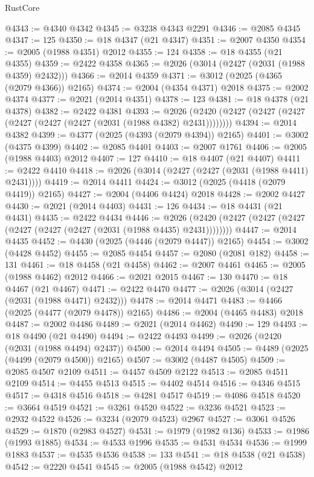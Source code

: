 \begin{lexlean}{RustCore}
\begin{coremodule}
@4343 := @4340 @4342
@4345 := @3238 @4343 @2291
@4346 := @2085 @4345
@4347 := 125
@4350 := @18 @4347 (@21 @4347)
@4351 := @2007 @4350
@4354 := @2005 (@1988 @4351) @2012
@4355 := 124
@4358 := @18 @4355 (@21 @4355)
@4359 := @2422 @4358
@4365 := @2026 (@3014 (@2427 (@2031 (@1988 @4359) @2432)))
@4366 := @2014 @4359
@4371 := @3012 (@2025 (@4365 (@2079 @4366)) @2165)
@4374 := @2004 (@4354 @4371) @2018
@4375 := @2002 @4374
@4377 := @2021 (@2014 @4351)
@4378 := 123
@4381 := @18 @4378 (@21 @4378)
@4382 := @2422 @4381
@4393 := @2026 (@2420 (@2427 (@2427 (@2427 (@2427 (@2427 (@2427 (@2031 (@1988 @4382) @2431))))))))
@4394 := @2014 @4382
@4399 := @4377 (@2025 (@4393 (@2079 @4394)) @2165)
@4401 := @3002 (@4375 @4399)
@4402 := @2085 @4401
@4403 := @2007 @1761
@4406 := @2005 (@1988 @4403) @2012
@4407 := 127
@4410 := @18 @4407 (@21 @4407)
@4411 := @2422 @4410
@4418 := @2026 (@3014 (@2427 (@2427 (@2031 (@1988 @4411) @2431))))
@4419 := @2014 @4411
@4424 := @3012 (@2025 (@4418 (@2079 @4419)) @2165)
@4427 := @2004 (@4406 @4424) @2018
@4428 := @2002 @4427
@4430 := @2021 (@2014 @4403)
@4431 := 126
@4434 := @18 @4431 (@21 @4431)
@4435 := @2422 @4434
@4446 := @2026 (@2420 (@2427 (@2427 (@2427 (@2427 (@2427 (@2427 (@2031 (@1988 @4435) @2431))))))))
@4447 := @2014 @4435
@4452 := @4430 (@2025 (@4446 (@2079 @4447)) @2165)
@4454 := @3002 (@4428 @4452)
@4455 := @2085 @4454
@4457 := @2080 (@2081 @182)
@4458 := 131
@4461 := @18 @4458 (@21 @4458)
@4462 := @2007 @4461
@4465 := @2005 (@1988 @4462) @2012
@4466 := @2021 @2015
@4467 := 130
@4470 := @18 @4467 (@21 @4467)
@4471 := @2422 @4470
@4477 := @2026 (@3014 (@2427 (@2031 (@1988 @4471) @2432)))
@4478 := @2014 @4471
@4483 := @4466 (@2025 (@4477 (@2079 @4478)) @2165)
@4486 := @2004 (@4465 @4483) @2018
@4487 := @2002 @4486
@4489 := @2021 (@2014 @4462)
@4490 := 129
@4493 := @18 @4490 (@21 @4490)
@4494 := @2422 @4493
@4499 := @2026 (@2420 (@2031 (@1988 @4494) @2437))
@4500 := @2014 @4494
@4505 := @4489 (@2025 (@4499 (@2079 @4500)) @2165)
@4507 := @3002 (@4487 @4505)
@4509 := @2085 @4507 @2109
@4511 := @4457 @4509 @2122
@4513 := @2085 @4511 @2109
@4514 := @4455 @4513
@4515 := @4402 @4514
@4516 := @4346 @4515
@4517 := @4318 @4516
@4518 := @4281 @4517
@4519 := @4086 @4518
@4520 := @3664 @4519
@4521 := @3261 @4520
@4522 := @3236 @4521
@4523 := @2932 @4522
@4526 := @3234 (@2079 @4523) @2967
@4527 := @3061 @4526
@4529 := @1870 (@2983 @4527)
@4531 := @1979 (@1982 @136)
@4533 := @1986 (@1993 @1885)
@4534 := @4533 @1996
@4535 := @4531 @4534
@4536 := @1999 @1883
@4537 := @4535 @4536
@4538 := 133
@4541 := @18 @4538 (@21 @4538)
@4542 := @2220 @4541
@4545 := @2005 (@1988 @4542) @2012

\end{coremodule}
\end{lexlean}
